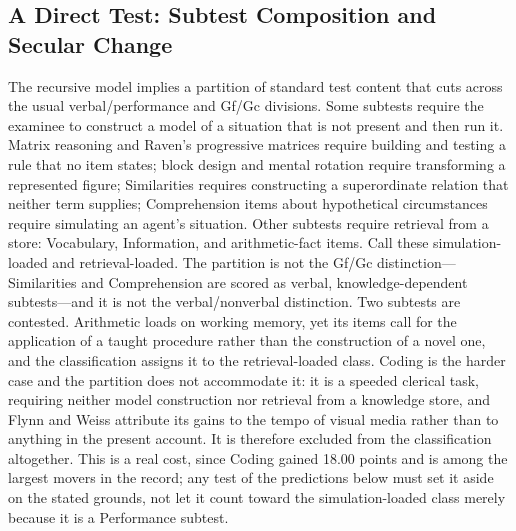 \documentclass[12pt,a4paper]{article}
\begin{document}
\subsection{A Direct Test: Subtest Composition and Secular Change}

The recursive model implies a partition of standard test content that cuts across the usual verbal/performance and Gf/Gc divisions. Some subtests require the examinee to construct a model of a situation that is not present and then run it. Matrix reasoning and Raven's progressive matrices require building and testing a rule that no item states; block design and mental rotation require transforming a represented figure; Similarities requires constructing a superordinate relation that neither term supplies; Comprehension items about hypothetical circumstances require simulating an agent's situation. Other subtests require retrieval from a store: Vocabulary, Information, and arithmetic-fact items. Call these simulation-loaded and retrieval-loaded. The partition is not the Gf/Gc distinction---\hspace{0pt}Similarities and Comprehension are scored as verbal, knowledge-dependent subtests---\hspace{0pt}and it is not the verbal/nonverbal distinction. Two subtests are contested. Arithmetic loads on working memory, yet its items call for the application of a taught procedure rather than the construction of a novel one, and the classification assigns it to the retrieval-loaded class. Coding is the harder case and the partition does not accommodate it: it is a speeded clerical task, requiring neither model construction nor retrieval from a knowledge store, and Flynn and Weiss attribute its gains to the tempo of visual media rather than to anything in the present account. It is therefore excluded from the classification altogether. This is a real cost, since Coding gained 18.00 points and is among the largest movers in the record; any test of the predictions below must set it aside on the stated grounds, not let it count toward the simulation-loaded class merely because it is a Performance subtest.
\end{document}
